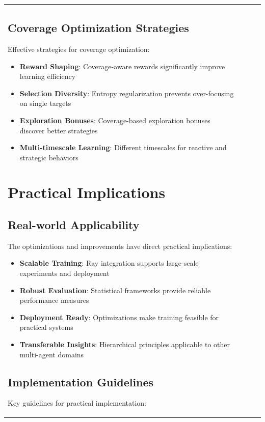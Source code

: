 \documentclass[12pt,a4paper]{report}
\begin{document}
\begin{table}[H]
\begin{table}[H]
\begin{tabular}{lccc}
\begin{table}[H]
\subsection{Coverage Optimization Strategies}
Effective strategies for coverage optimization:

\begin{itemize}
\item \textbf{Reward Shaping}: Coverage-aware rewards significantly improve learning efficiency
\item \textbf{Selection Diversity}: Entropy regularization prevents over-focusing on single targets
\item \textbf{Exploration Bonuses}: Coverage-based exploration bonuses discover better strategies
\item \textbf{Multi-timescale Learning}: Different timescales for reactive and strategic behaviors
\end{itemize}

\section{Practical Implications}

\subsection{Real-world Applicability}
The optimizations and improvements have direct practical implications:

\begin{itemize}
\item \textbf{Scalable Training}: Ray integration supports large-scale experiments and deployment
\item \textbf{Robust Evaluation}: Statistical frameworks provide reliable performance measures
\item \textbf{Deployment Ready}: Optimizations make training feasible for practical systems
\item \textbf{Transferable Insights}: Hierarchical principles applicable to other multi-agent domains
\end{itemize}

\subsection{Implementation Guidelines}
Key guidelines for practical implementation:


\end{table}
\end{tabular}
\end{table}
\end{table}
\end{document}
